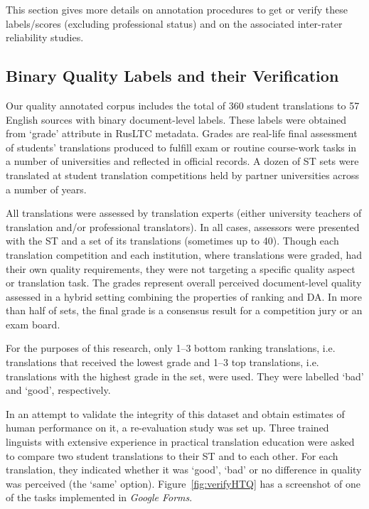 This section gives more details on annotation procedures to get or verify these labels/scores (excluding professional status) and on the associated inter-rater reliability studies.

\subsection{\label{ssec:binary}Binary Quality Labels and their Verification}

Our quality annotated corpus includes the total of 360 student translations to 57 English sources with binary document-level labels. These labels were obtained from `grade' attribute in \gls{RusLTC} metadata. Grades are real-life final assessment of students' translations produced to fulfill exam or routine course-work tasks in a number of universities and reflected in official records. A dozen of ST sets were translated at student translation competitions held by partner universities across a number of years. 

All translations were assessed by translation experts (either university teachers of translation and/or professional translators). In all cases, assessors were presented with the ST and a set of its translations (sometimes up to 40). Though each translation competition and each institution, where translations were graded, had their own quality requirements, they were not targeting a specific quality aspect or translation task. The grades represent overall perceived document-level quality assessed in a hybrid setting combining the properties of ranking and DA. In more than half of sets, the final grade is a consensus result for a competition jury or an exam board. 

For the purposes of this research, only 1--3 bottom ranking translations, i.e. translations that received the lowest grade and 1--3 top translations, i.e. translations with the highest grade in the set,  were used. They were labelled `bad' and `good', respectively.

In an attempt to validate the integrity of this dataset and obtain estimates of human performance on it, a re-evaluation study was set up. Three trained linguists with extensive experience in practical translation education were asked to compare two student translations to their ST and to each other.
For each translation, they indicated whether it was `good', `bad' or no difference in quality was perceived (the `same' option). Figure~\ref{fig:verifyHTQ} has a screenshot of one of the tasks implemented in \textit{Google Forms}.

